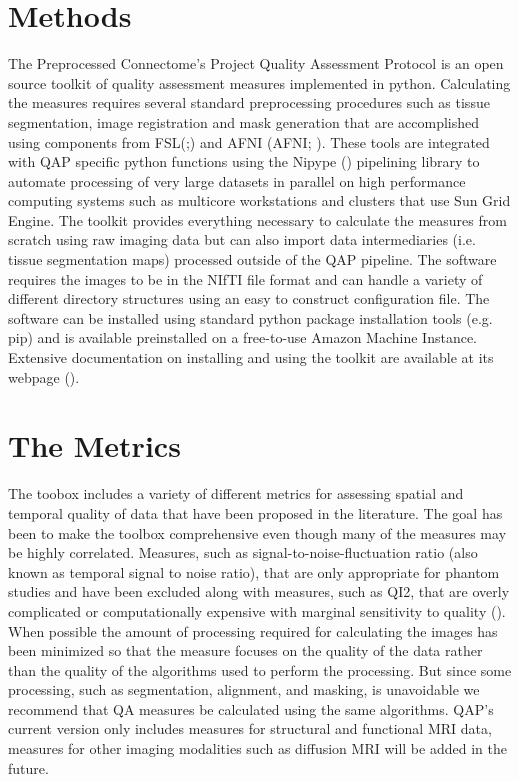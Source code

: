 \documentclass{frontiersSCNS} %
\begin{document}
\section{Methods}
\label{sec:1}
The Preprocessed Connectome’s Project Quality Assessment Protocol is an open source toolkit of quality assessment measures implemented in python. Calculating the measures requires several standard preprocessing procedures such as tissue segmentation, image registration and mask generation that are accomplished using components from FSL(;)  and AFNI (AFNI; ). These tools are integrated with QAP specific python functions using the Nipype () pipelining library to automate processing of very large datasets in parallel on high performance computing systems such as multicore workstations and clusters that use Sun Grid Engine. The toolkit provides everything necessary to calculate the measures from scratch using raw imaging data but can also import data intermediaries (i.e. tissue segmentation maps) processed outside of the QAP pipeline. The software requires the images to be in the NIfTI file format and can handle a variety of different directory structures using an easy to construct configuration file. The software can be installed using standard python package installation tools (e.g. pip) and is available preinstalled on a free-to-use Amazon Machine Instance. Extensive documentation on installing and using the toolkit are available at its webpage ().
\section{The Metrics}
\label{sec:2}
The toobox includes a variety of different metrics for assessing spatial and temporal quality of data that have been proposed in the literature. The goal has been to make the toolbox comprehensive even though many of the measures may be highly correlated. Measures, such as signal-to-noise-fluctuation ratio (also known as temporal signal to noise ratio), that are only appropriate for phantom studies and have been excluded along with measures, such as QI2, that are overly complicated or computationally expensive with marginal sensitivity to quality (). When possible the amount of processing required for calculating the images has been minimized so that the measure focuses on the quality of the data rather than the quality of the algorithms used to perform the processing. But since some processing, such as segmentation, alignment, and masking, is unavoidable we recommend that QA measures be calculated using the same algorithms. QAP’s current version only includes measures for structural and functional MRI data, measures for other imaging modalities such as diffusion MRI will be added in the future.
\end{document}
